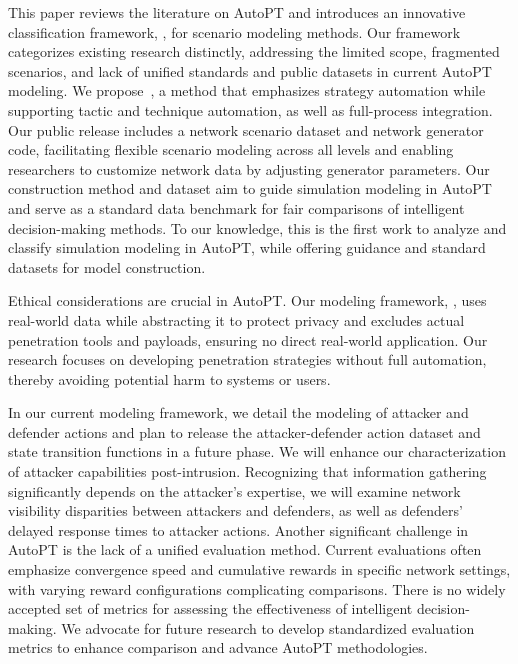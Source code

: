 This paper reviews the literature on AutoPT and introduces an innovative classification framework, \modelcla, for scenario modeling methods. Our framework categorizes existing research distinctly, addressing the limited scope, fragmented scenarios, and lack of unified standards and public datasets in current AutoPT modeling. We propose~\modelsim, a method that emphasizes strategy automation while supporting tactic and technique automation, as well as full-process integration. Our public release includes a network scenario dataset and network generator code, facilitating flexible scenario modeling across all levels and enabling researchers to customize network data by adjusting generator parameters.
Our construction method and dataset aim to guide simulation modeling in AutoPT and serve as a standard data benchmark for fair comparisons of intelligent decision-making methods. To our knowledge, this is the first work to analyze and classify simulation modeling in AutoPT, while offering guidance and standard datasets for model construction.


Ethical considerations are crucial in AutoPT. Our modeling framework, \modelsim, uses real-world data while abstracting it to protect privacy and excludes actual penetration tools and payloads, ensuring no direct real-world application. Our research focuses on developing penetration strategies without full automation, thereby avoiding potential harm to systems or users.

In our current modeling framework, we detail the modeling of attacker and defender actions and plan to release the attacker-defender action dataset and state transition functions in a future phase. We will enhance our characterization of attacker capabilities post-intrusion. Recognizing that information gathering significantly depends on the attacker's expertise, we will examine network visibility disparities between attackers and defenders, as well as defenders' delayed response times to attacker actions.
Another significant challenge in AutoPT is the lack of a unified evaluation method. Current evaluations often emphasize convergence speed and cumulative rewards in specific network settings, with varying reward configurations complicating comparisons. There is no widely accepted set of metrics for assessing the effectiveness of intelligent decision-making. We advocate for future research to develop standardized evaluation metrics to enhance comparison and advance AutoPT methodologies.


